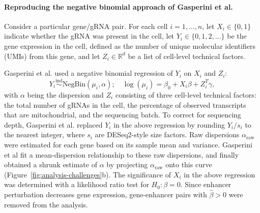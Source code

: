 \documentclass{nature}
\begin{document}
\paragraph{Reproducing the negative binomial approach of Gasperini et al.}

Consider a particular gene/gRNA pair. For each cell $i = 1, \dots, n$, let $X_i \in \{0,1\}$ indicate whether the gRNA was present in the cell, let $Y_i \in \{0,1,2,\dots\}$ be the gene expression in the cell, defined as the number of unique molecular identifiers (UMIs) from this gene, and let $Z_i \in \mathbb R^d$ be a list of cell-level technical factors.

Gasperini et al. used a negative binomial regression of $Y_i$ on $X_i$ and $Z_i$: 
\begin{equation}
Y_i \overset{\text{ind}} \sim \text{NegBin}(\mu_i, \alpha); \quad \log(\mu_i) = \beta_0 + X_i \beta + Z_i^T \gamma,
\label{negative-binomial}
\end{equation}
with $\alpha$ being the dispersion and $Z_i$ consisting of three cell-level technical factors: the total number of gRNAs in the cell, the percentage of observed transcripts that are mitochondrial, and the sequencing batch. To correct for sequencing depth, Gasperini et al. replaced $Y_i$ in the above regression by rounding $Y_i/s_i$ to the nearest integer, where $s_i$ are DESeq2-style size factors. Raw dispersions $\alpha_{\text{raw}}$ were estimated for each gene based on its sample mean and variance. Gasperini et al fit a mean-dispersion relationship to these raw dispersions, and finally obtained a shrunk estimate of $\alpha$ by projecting $\alpha_{\text{raw}}$ onto this curve (Figure~\ref{fig:analysis-challenges}b). The significance of $X_i$ in the above regression was determined with a likelihood ratio test for $H_0: \beta = 0$. Since enhancer perturbation decreases gene expression, gene-enhancer pairs with $\widehat \beta > 0$ were removed from the analysis. 
\end{document}
